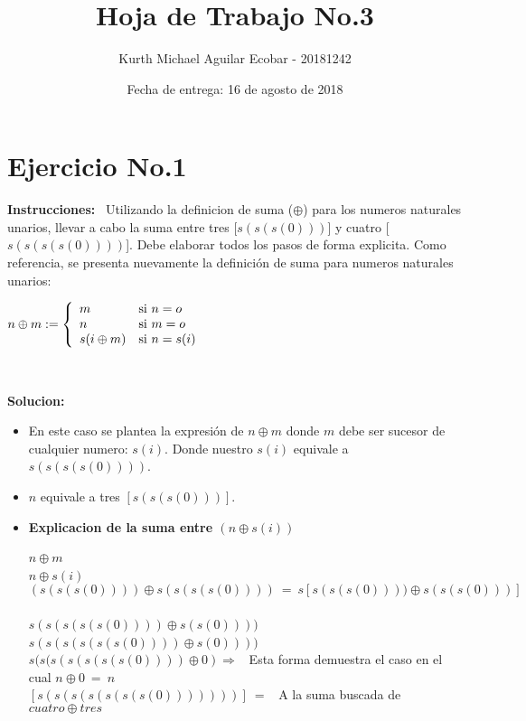 \documentclass[10pt,a4paper]{article}
\begin{document}
\title{Hoja de Trabajo No.3}
\author{Kurth Michael Aguilar Ecobar - 20181242}
\date{ Fecha de entrega: 16 de agosto de 2018 }
\maketitle


\section*{Ejercicio No.1}

\begin{flushleft}
\textbf{Instrucciones:} \ Utilizando la definicion de suma ($\oplus$) para los numeros naturales unarios, llevar
a cabo la suma entre tres [$s(s(s(0)))$] y cuatro [$s(s(s(s(0))))$]. Debe elaborar todos
los pasos de forma explicita. Como referencia, se presenta nuevamente la definici\'on de
suma para numeros naturales unarios:
\end{flushleft}

\begin{center}
$ n\oplus m := \left\{ 
\begin{array}{l l}
 m & \mbox{si } n=o \\ 
 n & \mbox{si } m=o \\ 
 s(i\oplus m) & \mbox{si } n=s(i) \\ 
 \end{array}
 \right.$
\end{center}

\
\\\begin{large}
\textbf{Solucion:}
\end{large}
\begin{itemize}
\item En este caso se plantea la expresión de $ n\oplus m $ donde $ m $ debe ser sucesor de cualquier numero: $ s(i) $. Donde nuestro $ s(i) $ equivale a   \ $ s(s(s(s(0))))  $. 
\item $n$ equivale a tres $ \left[ s(s(s(0))) \right]  $. 
\item \textbf{Explicacion de la suma entre $ (n\oplus s(i)) $}
\begin{center}
$ n\oplus m $
\
\\$n\oplus s(i)$
\
\\$( s(s(s(0)))) \oplus s(s(s(s(0)))) \ = \ s[ s(s(s(0)))) \oplus s(s(s(0)))]$
\
\\$ s(s(s(s(s(0)))) \oplus s(s(0))))$
\
\\$ s(s(s(s(s(s(0)))) \oplus s(0))))$
\
\\$ s(s(s(s(s(s(s(0)))) \oplus 0) \Rightarrow $ \ Esta forma demuestra el caso en el cual $ n\oplus 0 \ = \ n$
\
\\ $[s(s(s(s(s(s(s(0)))))))] \ =  $ \ A la suma buscada de  $ cuatro\oplus tres$ 
\end{center}
\end{itemize}
\end{document}
